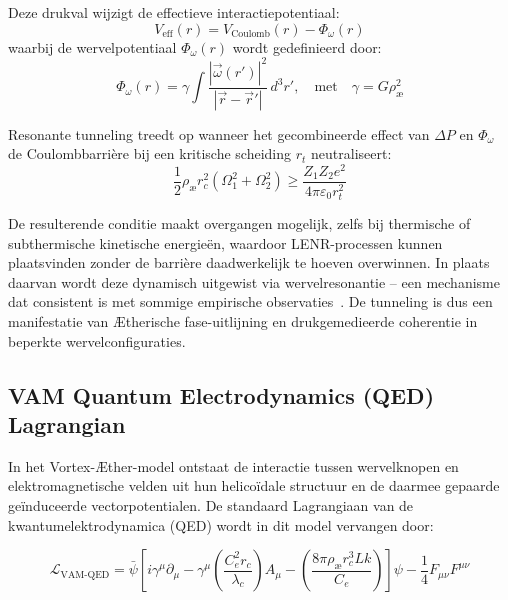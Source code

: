Deze drukval wijzigt de effectieve interactiepotentiaal:
\begin{equation}
    V_{\text{eff}}(r) = V_{\text{Coulomb}}(r) - \Phi_\omega(r)
\end{equation}
waarbij de wervelpotentiaal \( \Phi_\omega(r) \) wordt gedefinieerd door:
\begin{equation}
    \Phi_\omega(r) = \gamma \int \frac{|\vec{\omega}(r')|^2}{|\vec{r} - \vec{r}'|} \, d^3r',
    \quad \text{met} \quad
    \gamma = G \rho_{\text{\ae}}^2
\end{equation}

Resonante tunneling treedt op wanneer het gecombineerde effect van \( \Delta P \) en \( \Phi_\omega \) de Coulombbarrière bij een kritische scheiding \( r_t \) neutraliseert:
\begin{equation}
    \frac{1}{2} \rho_{\text{\ae}} r_c^2 (\Omega_1^2 + \Omega_2^2) \geq \frac{Z_1 Z_2 e^2}{4\pi \varepsilon_0 r_t^2}
\end{equation}

De resulterende conditie maakt overgangen mogelijk, zelfs bij thermische of subthermische kinetische energieën, waardoor LENR-processen kunnen plaatsvinden zonder de barrière daadwerkelijk te hoeven overwinnen. In plaats daarvan wordt deze dynamisch uitgewist via wervelresonantie – een mechanisme dat consistent is met sommige empirische observaties~\cite{Storms2021}. De tunneling is dus een manifestatie van Ætherische fase-uitlijning en drukgemedieerde coherentie in beperkte wervelconfiguraties.



\subsection*{VAM Quantum Electrodynamics (QED) Lagrangian}

In het Vortex-\AE ther-model ontstaat de interactie tussen wervelknopen en elektromagnetische velden uit hun helicoïdale structuur en de daarmee gepaarde geïnduceerde vectorpotentialen. De standaard Lagrangiaan van de kwantumelektrodynamica (QED) wordt in dit model vervangen door:

\begin{equation}
    \mathcal{L}_{\text{VAM-QED}} =
    \bar{\psi} \left[ i \gamma^\mu \partial_\mu
                   - \gamma^\mu \left( \frac{C_e^2 r_c}{\lambda_c} \right) A_\mu
                   - \left( \frac{8\pi \rho_{\text{\ae}} r_c^3 Lk}{C_e} \right) \right] \psi
    - \frac{1}{4} F_{\mu\nu} F^{\mu\nu}
\end{equation}

